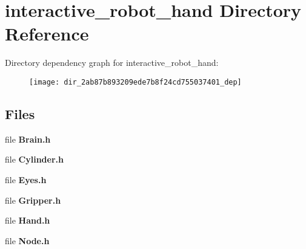 \section{interactive\-\_\-robot\-\_\-hand Directory Reference}
\label{dir_2ab87b893209ede7b8f24cd755037401}
Directory dependency graph for interactive\-\_\-robot\-\_\-hand\-:
\nopagebreak
\begin{figure}[H]
\begin{center}
\leavevmode
\texttt{[image: dir\_2ab87b893209ede7b8f24cd755037401\_dep]}
\end{center}
\end{figure}
\subsection*{Files}
\begin{DoxyCompactItemize}
\item 
file {\bf Brain.\-h}
\item 
file {\bf Cylinder.\-h}
\item 
file {\bf Eyes.\-h}
\item 
file {\bf Gripper.\-h}
\item 
file {\bf Hand.\-h}
\item 
file {\bf Node.\-h}
\end{DoxyCompactItemize}
